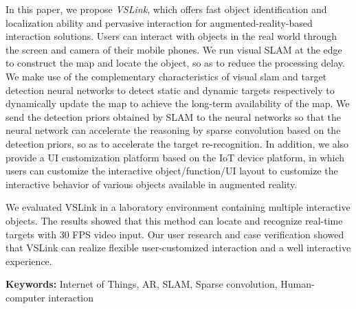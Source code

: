In this paper, we propose \textit{VSLink}, which offers fast object identification and localization ability and pervasive interaction for augmented-reality-based interaction solutions. Users can interact with objects in the real world through the screen and camera of their mobile phones.
We run visual SLAM at the edge to construct the map and locate the object, so as to reduce the processing delay. We make use of the complementary characteristics of visual slam and target detection neural networks to detect static and dynamic targets respectively to dynamically update the map to achieve the long-term availability of the map.
We send the detection priors obtained by SLAM to the neural networks so that the neural network can accelerate the reasoning by sparse convolution based on the detection priors, so as to accelerate the target re-recognition. In addition, we also provide a UI customization platform based on the IoT device platform, in which users can customize the interactive object/function/UI layout to customize the interactive behavior of various objects available in augmented reality.

We evaluated VSLink in a laboratory environment containing multiple interactive objects. The results showed that this method can locate and recognize real-time targets with 30 FPS video input. Our user research and case verification showed that VSLink can realize flexible user-customized interaction and a well interactive experience.

\noindent\textbf{Keywords:} Internet of Things, AR, SLAM, Sparse convolution, Human-computer interaction